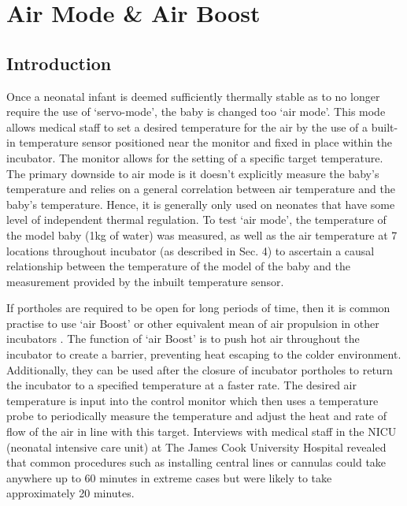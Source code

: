 \documentclass{article}
\begin{document}
\section{Air Mode \& Air Boost} \label{AirModeBoostSection}

\subsection{Introduction}
 \vspace{3mm}

Once a neonatal infant is deemed sufficiently thermally stable as to no longer require the use of ‘servo-mode', the baby is changed too ‘air mode’. This mode allows medical staff to set a desired temperature for the air by the use of a built-in temperature sensor positioned near the monitor and fixed in place within the incubator. The monitor allows for the setting of a specific target temperature. The primary downside to air mode is it doesn’t explicitly measure the baby’s temperature and relies on a general correlation between air temperature and the baby’s temperature. Hence, it is generally only used on neonates that have some level of independent thermal regulation. To test ‘air mode’, the temperature of the model baby (1kg of water) was measured, as well as the air temperature at 7 locations throughout incubator (as described in Sec. 4) to ascertain a causal relationship between the temperature of the model of the baby and the measurement provided by the inbuilt temperature sensor. 

 \vspace{3mm}

If portholes are required to be open for long periods of time, then it is common practise to use ‘air Boost’ or other equivalent mean of air propulsion in other incubators \cite{BTT10} . The function of ‘air Boost’ is to push hot air throughout the incubator to create a barrier, preventing heat escaping to the colder environment. Additionally, they can be used after the closure of incubator portholes to return the incubator to a specified temperature at a faster rate. The desired air temperature is input into the control monitor which then uses a temperature probe to periodically measure the temperature and adjust the heat and rate of flow of the air in line with this target. Interviews with medical staff in the NICU (neonatal intensive care unit) at The James Cook University Hospital revealed that common procedures such as installing central lines or cannulas could take anywhere up to 60 minutes in extreme cases but were likely to take approximately 20 minutes.  
\end{document}
